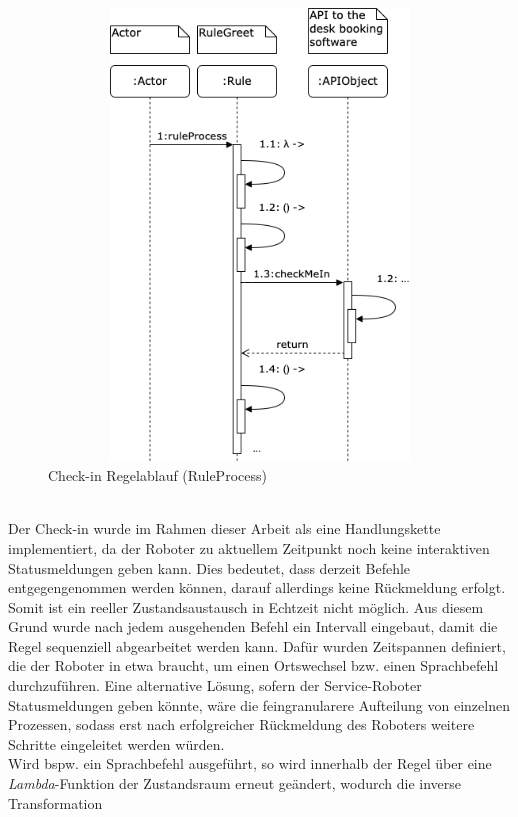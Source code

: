         \begin{figure}[hbt!]
            \centering
            \includegraphics[width=14cm,height=12cm,keepaspectratio]{images/sequence_rule_temi_greet.png}
            \caption{Check-in Regelablauf (RuleProcess)}
            \label{fig:sequenceRuleGreet}
        \end{figure}
        \\
        \linebreak
        Der Check-in wurde im Rahmen dieser Arbeit als eine Handlungskette implementiert, da der Roboter zu aktuellem Zeitpunkt noch keine interaktiven Statusmeldungen geben kann. Dies 
        bedeutet, dass derzeit Befehle entgegengenommen werden können, darauf allerdings keine Rückmeldung erfolgt. Somit ist ein reeller Zustandsaustausch in Echtzeit nicht möglich. 
        Aus diesem Grund wurde nach jedem ausgehenden Befehl ein Intervall eingebaut, damit die Regel sequenziell abgearbeitet werden kann. Dafür wurden Zeitspannen definiert, die 
        der Roboter in etwa braucht, um einen Ortswechsel bzw. einen Sprachbefehl durchzuführen. Eine alternative Lösung, sofern der Service-Roboter Statusmeldungen geben 
        könnte, wäre die feingranularere Aufteilung von einzelnen Prozessen, sodass erst nach erfolgreicher Rückmeldung des Roboters weitere Schritte eingeleitet werden würden.
        \\
        \linebreak
        Wird bspw. ein Sprachbefehl ausgeführt, so wird innerhalb der Regel über eine \textit{Lambda}-Funktion der Zustandsraum erneut geändert, wodurch die inverse Transformation 
